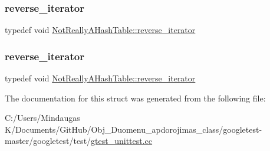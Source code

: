 \subsubsection{\texorpdfstring{reverse\_iterator}{reverse\_iterator}\hspace{0.1cm}{\footnotesize\ttfamily [2/3]}}
{\footnotesize\ttfamily typedef void \mbox{\hyperlink{struct_not_really_a_hash_table_a8dbee2a2a80768191c736fb57367cfe7}{Not\+Really\+A\+Hash\+Table\+::reverse\+\_\+iterator}}}

\mbox{\label{struct_not_really_a_hash_table_a8dbee2a2a80768191c736fb57367cfe7}} 
\subsubsection{\texorpdfstring{reverse\_iterator}{reverse\_iterator}\hspace{0.1cm}{\footnotesize\ttfamily [3/3]}}
{\footnotesize\ttfamily typedef void \mbox{\hyperlink{struct_not_really_a_hash_table_a8dbee2a2a80768191c736fb57367cfe7}{Not\+Really\+A\+Hash\+Table\+::reverse\+\_\+iterator}}}



The documentation for this struct was generated from the following file\+:\begin{DoxyCompactItemize}
\item 
C\+:/\+Users/\+Mindaugas K/\+Documents/\+Git\+Hub/\+Obj\+\_\+\+Duomenu\+\_\+apdorojimas\+\_\+class/googletest-\/master/googletest/test/\mbox{\hyperlink{googletest-master_2googletest_2test_2gtest__unittest_8cc}{gtest\+\_\+unittest.\+cc}}\end{DoxyCompactItemize}
